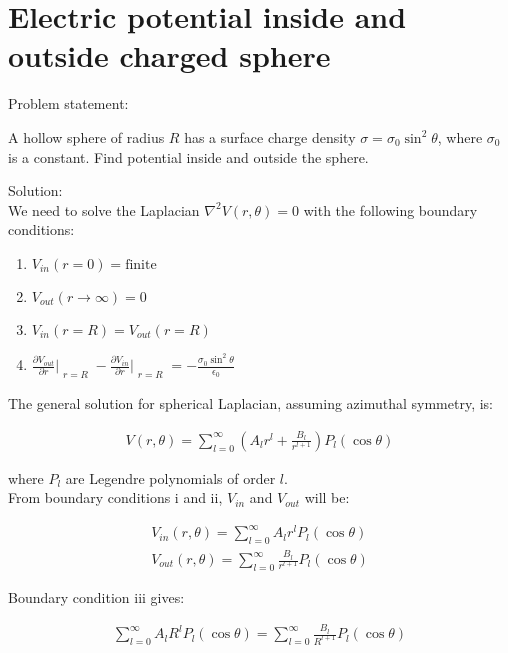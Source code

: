 \documentclass[12pt, a4paper]{article}
\begin{document}
\section{Electric potential inside and outside charged sphere}

Problem statement:

\begin{displayquote}
A hollow sphere of radius $R$ has a surface charge density $\sigma = \sigma_0\sin^2\theta$, where $\sigma_0$ is a constant. Find potential inside and outside the sphere.
\end{displayquote}

Solution: \\

We need to solve the Laplacian $\nabla^2 V(r, \theta)=0$ with the following boundary conditions:

\begin{enumerate}[i]
  \item $V_{in}(r=0)=\text{finite}$
  \item $V_{out}(r \rightarrow \infty) = 0$
  \item $V_{in} (r=R) = V_{out} (r=R)$
  \item $\displaystyle \frac{\partial V_{out}}{\partial r}\Bigr|_{\substack{r=R}}-\frac{\partial V_{in}}{\partial r}\Bigr|_{\substack{r=R}}=-\frac{\sigma_0\sin^2\theta}{\epsilon_0}$
\end{enumerate}

The general solution for spherical Laplacian, assuming azimuthal symmetry, is:

\begin{gather}
V (r, \theta) = \sum_{l=0}^\infty \left( A_l r^l + \frac{B_l}{r^{l+1}} \right) P_l (\cos\theta)
\end{gather}

where $P_l$ are Legendre polynomials of order $l$. \\

From boundary conditions i and ii, $V_{in}$ and $V_{out}$ will be:

\begin{gather}
V_{in} (r, \theta) = \sum_{l=0}^\infty A_l r^l P_l (\cos\theta) \\
V_{out} (r, \theta) = \sum_{l=0}^\infty \frac{B_l}{r^{l+1}} P_l (\cos\theta)
\end{gather}

Boundary condition iii gives:

\begin{gather}
\sum_{l=0}^\infty A_l R^l P_l (\cos\theta) = \sum_{l=0}^\infty \frac{B_l}{R^{l+1}} P_l (\cos\theta)
\end{gather}
\end{document}
